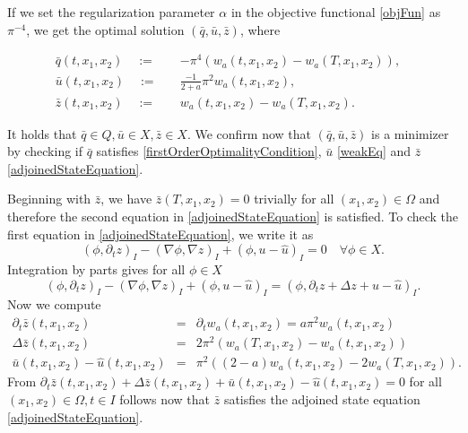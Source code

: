 If we set the regularization parameter $\alpha$ in the objective functional \eqref{objFun} as $\pi^{-4}$, we get the optimal solution $(\bar{q}, \bar{u}, \bar{z})$, where

\begin{equation}
\label{analyticalSolution}
\begin{aligned}
\bar{q}(t,x_1,x_2)\quad:=\quad&-\pi^4\left(w_a(t,x_1,x_2)-w_a(T,x_1,x_2)\right),&\\
\bar{u}(t,x_1,x_2)\quad:=\quad&\frac{-1}{2+a}\pi^2w_a(t,x_1,x_2),&\\
\bar{z}(t,x_1,x_2)\quad:=\quad&w_a(t,x_1,x_2)-w_a(T,x_1,x_2).&
\end{aligned}
\end{equation}

It holds that $\bar{q}\in Q, \bar{u}\in X, \bar{z}\in X$. We confirm now that $(\bar{q}, \bar{u}, \bar{z})$ is a minimizer by checking if $\bar{q}$ satisfies \eqref{firstOrderOptimalityCondition}, $\bar{u}$ \eqref{weakEq} and $\bar{z}$ \eqref{adjoinedStateEquation}.

Beginning with $\bar{z}$, we have $\bar{z}(T, x_1, x_2)=0$ trivially for all $(x_1,x_2)\in\Omega$ and therefore the second equation in \eqref{adjoinedStateEquation} is satisfied. To check the first equation in \eqref{adjoinedStateEquation}, we write it as
\begin{displaymath}
(\phi,\partial_tz)_I-(\nabla \phi,\nabla z)_I+(\phi, u-\hat{u})_I=0\quad\forall\phi\in X.
\end{displaymath}
Integration by parts gives for all $\phi\in X$
\begin{displaymath}
(\phi,\partial_tz)_I-(\nabla \phi,\nabla z)_I+(\phi, u-\hat{u})_I=(\phi,\partial_tz+\Delta z+u-\hat{u})_I.
\end{displaymath}
Now we compute
\begin{eqnarray*}
\partial_t\bar{z}(t,x_1,x_2)&=&\partial_tw_a(t,x_1,x_2)=a\pi^2w_a(t,x_1,x_2)\\
\Delta \bar{z}(t,x_1,x_2)&=&2\pi^2(w_a(T,x_1,x_2)-w_a(t,x_1,x_2))\\
\bar{u}(t,x_1,x_2)-\hat{u}(t,x_1,x_2)&=&\pi^2((2-a)w_a(t,x_1,x_2)-2w_a(T,x_1,x_2)).
\end{eqnarray*}
From $\partial_t\bar{z}(t,x_1,x_2)+\Delta \bar{z}(t,x_1,x_2)+\bar{u}(t,x_1,x_2)-\hat{u}(t,x_1,x_2)=0$ for all $(x_1,x_2)\in\Omega, t\in I$ follows now that $\bar{z}$ satisfies the adjoined state equation \eqref{adjoinedStateEquation}.

